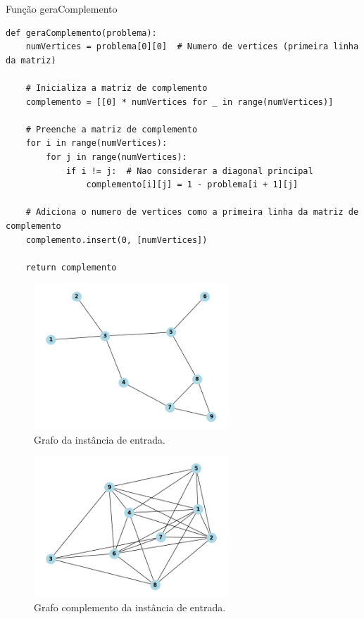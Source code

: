 \documentclass[compress,aspectratio=169]{beamer}
\begin{document}
    \begin{frame}[fragile]{Função geraComplemento}
        \begin{lstlisting}
def geraComplemento(problema):
    numVertices = problema[0][0]  # Numero de vertices (primeira linha da matriz)
    
    # Inicializa a matriz de complemento
    complemento = [[0] * numVertices for _ in range(numVertices)]
    
    # Preenche a matriz de complemento
    for i in range(numVertices):
        for j in range(numVertices):
            if i != j:  # Nao considerar a diagonal principal
                complemento[i][j] = 1 - problema[i + 1][j]
    
    # Adiciona o numero de vertices como a primeira linha da matriz de complemento
    complemento.insert(0, [numVertices])
    
    return complemento
        \end{lstlisting}
    \end{frame}
    \begin{frame}
        \begin{figure}[H]
            \centering
            \includegraphics[width=0.65\textwidth]{images/grafo_instancia1.png}
            \caption{Grafo da instância de entrada.}
            \label{fig:instancia1}
        \end{figure}
    \end{frame} 

    \begin{frame}
        \begin{figure}[H]
            \centering
            \includegraphics[width=0.65\textwidth]{images/conj_instancia1.png}
            \caption{Grafo complemento da instância de entrada.}
            \label{fig:instancia2}
        \end{figure}
    \end{frame}
    
\end{document}
